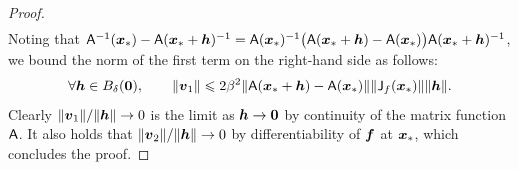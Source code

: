 \begin{proof}
\begin{align*}
    \end{align*}
    Noting that $ \mat A^{-1}(\vect x_*) - \mat A(\vect x_* + \vect h)^{-1} = \mat A(\vect x_*)^{-1} \bigl(\mat A(\vect x_* + \vect h) - \mat A(\vect x_*)\bigr) \mat A(\vect x_* + \vect h)^{-1}$,
    we bound the norm of the first term on the right-hand side as follows:
    \begin{align*}
        \forall \vect h \in B_{\delta}(\vect 0), \qquad
        \norm{\vect v_1}
        \leq 2 \beta^2 \norm{\mat A(\vect x_* + \vect h) - \mat A(\vect x_*)} \norm{\mat J_f(\vect x_*)} \norm{\vect h}.
    \end{align*}
    Clearly $\norm{\vect v_1} / \norm{\vect h} \to 0$ is the limit as $\vect h \to \vect 0$ by continuity of the matrix function $\mat A$.
    It also holds that $\norm{\vect v_2} / \norm{\vect h} \to 0$ by differentiability of $\vect f$ at $\vect x_*$,
    which concludes the proof.
\end{proof}

